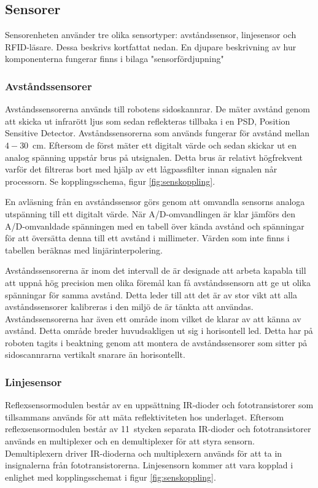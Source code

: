 \subsection{Sensorer}
Sensorenheten använder tre olika sensortyper: avståndssensor, linjesensor och RFID-läsare.
Dessa beskrivs kortfattat nedan. En djupare beskrivning av hur komponenterna fungerar finns i bilaga "sensorfördjupning"

\subsubsection{Avståndssensorer}
Avståndssensorerna används till robotens sidoskannrar. De mäter avstånd genom att skicka ut infrarött ljus som sedan reflekteras tillbaka i en PSD, Position Sensitive Detector. Avståndssensorerna som används fungerar för avstånd mellan \mbox{$4-30$ cm}. Eftersom de först mäter ett digitalt värde och sedan skickar ut en analog spänning uppstår brus på utsignalen. Detta brus är relativt högfrekvent varför det filtreras bort med hjälp av ett lågpassfilter innan signalen når processorn. Se kopplingsschema, figur \ref{fig:senskoppling}.

En avläsning från en avståndssensor görs genom att omvandla sensorns analoga utspänning till ett digitalt värde. När A/D-omvandlingen är klar jämförs den A/D-omvanldade spänningen med en tabell över kända avstånd och spänningar för att översätta denna till ett avstånd i millimeter. Värden som inte finns i tabellen beräknas med linjärinterpolering. 

Avståndssensorerna är inom det intervall de är designade att arbeta kapabla till att uppnå hög precision men olika föremål kan få avståndssensorn att ge ut olika spänningar för samma avstånd. Detta leder till att det är av stor vikt att alla avståndssensorer kalibreras i den miljö de är tänkta att användas. Avståndssensorerna har även ett område inom vilket de klarar av att känna av avstånd. Detta område breder huvudsakligen ut sig i horisontell led. Detta har på roboten tagits i beaktning genom att montera de avståndssensorer som sitter på sidoscannrarna vertikalt snarare än horisontellt.

\subsubsection{Linjesensor}
Reflexsensormodulen består av en uppsättning IR-dioder och fototransistorer som tillsammans används för att mäta reflektiviteten hos underlaget. Eftersom reflexsensormodulen består av 11~stycken separata IR-dioder och fototransistorer används en multiplexer och en demultiplexer för att styra sensorn. Demultiplexern driver IR-dioderna och multiplexern används för att ta in insignalerna från fototransistorerna. Linjesensorn kommer att vara kopplad i enlighet med kopplingsschemat i figur \ref{fig:senskoppling}.

